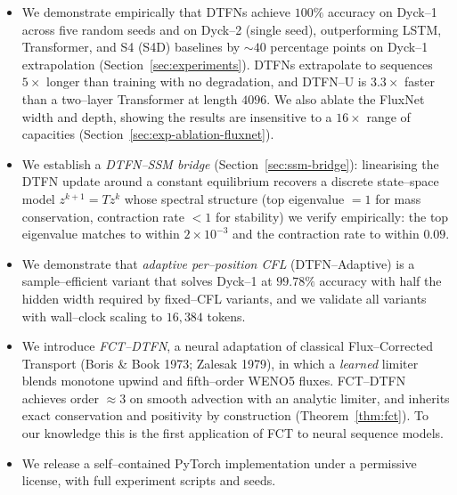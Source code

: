 \documentclass[10pt]{article}
\theoremstyle{definition}
\theoremstyle{remark}
\begin{document}
\begin{itemize}[leftmargin=*,itemsep=2pt]
        DTFN mass trajectory converges to the entropy solution of a
        neural scalar conservation law $\partial_t p + \partial_x
        F(p;\theta) = 0$, and a \emph{universal approximation theorem}
        for local translation--equivariant sequence maps
        (Theorem~\ref{thm:univ}).
  \item We demonstrate empirically that DTFNs achieve $100\%$
        accuracy on Dyck--1 across five random seeds and on Dyck--2
        (single seed), outperforming LSTM, Transformer, and S4 (S4D)
        baselines by $\sim 40$ percentage points on Dyck--1
        extrapolation
        (Section~\ref{sec:experiments}).  DTFNs extrapolate to
        sequences $5\times$ longer than training with no degradation,
        and DTFN--U is $3.3\times$ faster than a two--layer
        Transformer at length $4096$.  We also ablate the FluxNet
        width and depth, showing the results are insensitive to a
        $16\times$ range of capacities (Section~\ref{sec:exp-ablation-fluxnet}).
  \item We establish a \emph{DTFN--SSM bridge}
        (Section~\ref{sec:ssm-bridge}): linearising the DTFN update
        around a constant equilibrium recovers a discrete state--space
        model $z^{k+1} = T z^k$ whose spectral structure (top
        eigenvalue $= 1$ for mass conservation, contraction rate $<
        1$ for stability) we verify empirically: the top eigenvalue
        matches to within $2\times 10^{-3}$ and the contraction rate
        to within $0.09$.
  \item We demonstrate that \emph{adaptive per--position CFL}
        (DTFN--Adaptive) is a sample--efficient variant that solves
        Dyck--1 at $99.78\%$ accuracy with half the hidden width
        required by fixed--CFL variants, and we validate all
        variants with wall--clock scaling to $16{,}384$ tokens.
  \item We introduce \emph{FCT--DTFN}, a neural adaptation of
        classical Flux--Corrected Transport (Boris \& Book 1973;
        Zalesak 1979), in which a \emph{learned} limiter blends
        monotone upwind and fifth--order WENO5 fluxes.  FCT--DTFN
        achieves order $\approx 3$ on smooth advection with an
        analytic limiter, and inherits exact conservation and
        positivity by construction (Theorem~\ref{thm:fct}).  To
        our knowledge this is the first application of FCT to
        neural sequence models.
  \item We release a self--contained PyTorch implementation under a
        permissive license, with full experiment scripts and seeds.
\end{itemize}
\end{document}

